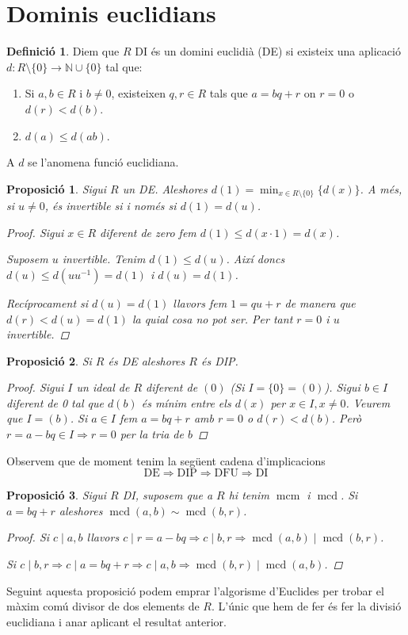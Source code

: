 \documentclass[a4paper,11pt]{report}
\newcommand{\inv}[1]{#1^{-1}}
\renewcommand{\div}{\mid}
\DeclareMathOperator{\mcd}{mcd}
\DeclareMathOperator{\mcm}{mcm}
\newcommand{\im}{\Rightarrow}
\theoremstyle{theorem}
\newtheorem{proposicio}{\normalfont \sffamily\bfseries Proposició}[section]
\theoremstyle{definition}
\newtheorem{definicio}{\normalfont\sffamily\bfseries Definició}[section]
\begin{document}
\section{Dominis euclidians}
\begin{definicio}
	Diem que $R$ DI és un domini euclidià (DE) si existeix una aplicació $d:R\setminus\{0\}\longrightarrow \mathbb{N}\cup \{0\}$ tal que:
	\begin{enumerate}
		\item Si $a,b\in R$ i $b\neq 0$, existeixen $q,r\in R$ tals que $a=bq+r$ on $r=0$ o $d(r)<d(b)$.
		\item $d(a)\leq d(ab)$.
	\end{enumerate}
A $d$ se l'anomena funció euclidiana.
\end{definicio}
\begin{proposicio}
	Sigui $R$ un DE. Aleshores $d(1)=\min_{x\in R\setminus\{0\}}\{d(x)\}$. A més, si $u\neq 0$, és invertible si i només si $d(1)=d(u)$.\begin{proof}
		Sigui $x\in R$ diferent de zero fem $d(1)\leq d(x\cdot 1)=d(x)$.
		
		Suposem $u$ invertible. Tenim $d(1)\leq d(u)$. Així doncs $d(u)\leq d(u\inv{u})=d(1)$ i $d(u)=d(1)$.
		
		Recíprocament si $d(u)=d(1)$ llavors fem $1=qu+r$ de manera que $d(r)<d(u)=d(1)$ la quial cosa no pot ser. Per tant $r=0$ i $u$ invertible.
	\end{proof}
\end{proposicio}
\begin{proposicio}
	Si $R$ és DE aleshores $R$ és DIP.
	\begin{proof}
		Sigui $I$ un ideal de $R$ diferent de $(0)$ (Si $I=\{0\}=(0)$). Sigui $b\in I$ diferent de 0 tal que $d(b)$ és mínim entre els $d(x)$ per $x\in I,x\neq0$. Veurem que $I=(b)$. Si $a\in I$ fem $a=bq+r$ amb $r=0$ o $d(r)<d(b)$. Però $r=a-bq\in I\im r=0$ per la tria de $b$
	\end{proof}
\end{proposicio}

Observem que de moment tenim la següent cadena d'implicacions $$\text{DE}\im \text{DIP}\im \text{DFU}\im \text{DI}$$
\begin{proposicio}
	Sigui $R$ DI, suposem que a $R$ hi tenim $\mcm$ i $\mcd$. Si $a=bq+r$ aleshores $\mcd(a,b)\sim\mcd(b,r)$.
	\begin{proof}
		Si $c\div a,b$ llavors $c\div r=a-bq\im c\div b,r\im \mcd(a,b)\div\mcd(b,r)$.
		
		Si $c\div b,r\im c\div a=bq+r\im c\div a,b\im \mcd(b,r)\div\mcd(a,b)$.
	\end{proof}
\end{proposicio}
Seguint aquesta proposició podem emprar l'algorisme d'Euclides per trobar el màxim comú divisor de dos elements de $R$. L'únic que hem de fer és fer la divisió euclidiana i anar aplicant el resultat anterior.
\end{document}

